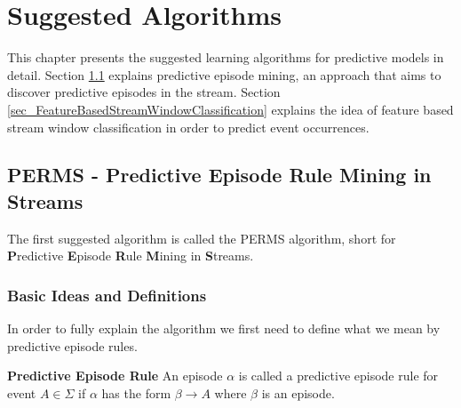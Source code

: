 \chapter{Suggested Algorithms}
\label{chapter_solutions}

\ifpdf
    \graphicspath{{Chapter4/Figs/Raster/}{Chapter4/Figs/PDF/}{Chapter4/Figs/}}
\else
    \graphicspath{{Chapter4/Figs/Vector/}{Chapter4/Figs/}}
\fi

This chapter presents the suggested learning algorithms for predictive models in detail. Section \ref{sec_predictiveEpisodeMining} explains predictive episode mining, an approach that aims to discover predictive episodes in the stream. Section \ref{sec_FeatureBasedStreamWindowClassification} explains the idea of feature based stream window classification in order to predict event occurrences. 

\section{PERMS - Predictive Episode Rule Mining in Streams}
\label{sec_predictiveEpisodeMining}
The first suggested algorithm is called the PERMS algorithm, short for \textbf{P}redictive \textbf{E}pisode \textbf{R}ule \textbf{M}ining in \textbf{S}treams.

\subsection{Basic Ideas and Definitions}
In order to fully explain the algorithm we first need to define what we mean by predictive episode rules.

\begin{mydef}
\label{def_predictiveEpisode}
\textbf{Predictive Episode Rule} An episode $\alpha$ is called a predictive episode rule for event $A \in \Sigma$ if $\alpha$ has the form $\beta \rightarrow A$ where $\beta$ is an episode. 
\end{mydef}

